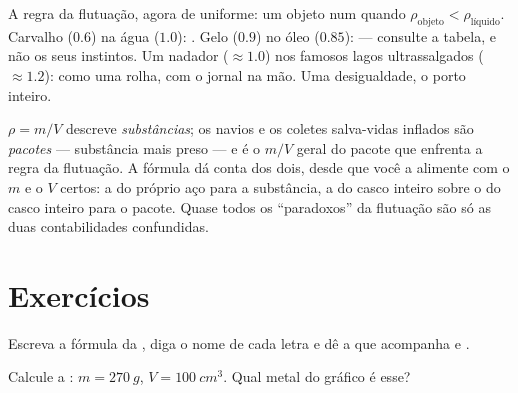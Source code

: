 \begin{example}\label{ex:g7:volume-mass-density:floating}
A regra da flutuação, agora de uniforme: um objeto  num 
quando $\rho_{\text{objeto}} < \rho_{\text{líquido}}$. Carvalho
($0.6$) na água ($1.0$): . Gelo ($0.9$) no óleo ($0.85$):
 --- consulte a tabela, e não os seus instintos. Um nadador
($\approx 1.0$) nos famosos lagos ultrassalgados ($\approx 1.2$):
 como uma rolha, com o jornal na mão. Uma desigualdade, o porto
inteiro.
\end{example}

\begin{remark}\label{rem:g7:volume-mass-density:parcel}
$\rho = m/V$ descreve \emph{substâncias}; os navios e os coletes
salva-vidas inflados são \emph{pacotes} --- substância mais  preso
--- e é o $m/V$ geral do pacote que enfrenta a regra da flutuação. A
fórmula dá conta dos dois, desde que você a alimente com o $m$ e o
$V$ certos: a  do próprio aço para a substância, a  do
casco inteiro sobre o  do casco inteiro para o pacote. Quase
todos os ``paradoxos'' da flutuação são só as duas contabilidades
confundidas.
\end{remark}

\section{Exercícios}

\begin{exercise}[$\star$]\label{exo:g7:volume-mass-density:1}
Escreva a fórmula da , diga o nome de cada letra e dê a
 que acompanha  e .
\end{exercise}

\begin{exercise}[$\star$]\label{exo:g7:volume-mass-density:2}
Calcule a : $m = \qty{270}{g}$, $V = \qty{100}{cm^3}$. Qual
metal do gráfico é esse?
\end{exercise}


